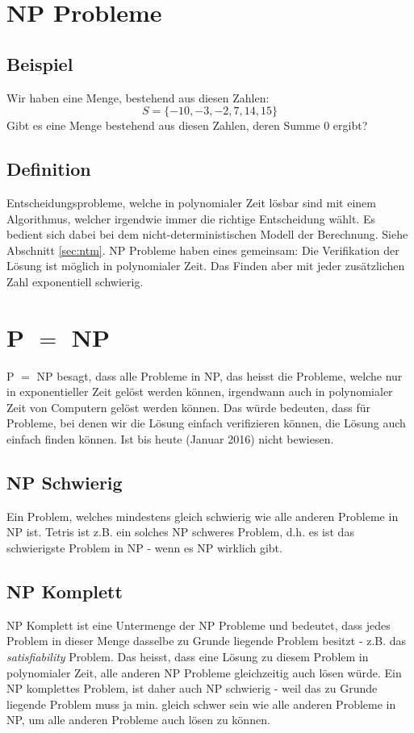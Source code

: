\section{NP Probleme}
\subsection{Beispiel}
Wir haben eine Menge, bestehend aus diesen Zahlen:
\begin{displaymath}
S = \{ -10, -3, -2,7, 14, 15 \}
\end{displaymath}
Gibt es eine Menge bestehend aus diesen Zahlen, deren Summe 0 ergibt?

\subsection{Definition}
Entscheidungsprobleme, welche in polynomialer Zeit lösbar sind mit einem Algorithmus, welcher irgendwie immer die richtige Entscheidung wählt. Es bedient sich dabei bei dem nicht-deterministischen Modell der Berechnung. Siehe Abschnitt \ref{sec:ntm}. NP Probleme haben eines gemeinsam: Die Verifikation der Lösung ist möglich in polynomialer Zeit. Das Finden aber mit jeder zusätzlichen Zahl exponentiell schwierig. 

\section{P \(=\) NP}
P \(=\) NP besagt, dass alle Probleme in NP, das heisst die Probleme, welche nur in exponentieller Zeit gelöst werden können, irgendwann auch in polynomialer Zeit von Computern gelöst werden können. Das würde bedeuten, dass für Probleme, bei denen wir die Lösung einfach verifizieren können, die Lösung auch einfach finden können. Ist bis heute (Januar 2016) nicht bewiesen.

\subsection{NP Schwierig}
Ein Problem, welches mindestens gleich schwierig wie alle anderen Probleme in NP ist. Tetris ist z.B. ein solches NP schweres Problem, d.h. es ist das schwierigste Problem in NP - wenn es NP wirklich gibt.
\subsection{NP Komplett}
NP Komplett ist eine Untermenge der NP Probleme und bedeutet, dass jedes Problem in dieser Menge dasselbe zu Grunde liegende Problem besitzt - z.B. das \textit{satisfiability} Problem. Das heisst, dass eine Lösung zu diesem Problem in polynomialer Zeit, alle anderen NP Probleme gleichzeitig auch lösen würde. Ein NP komplettes Problem, ist daher auch NP schwierig - weil das zu Grunde liegende Problem muss ja min. gleich schwer sein wie alle anderen Probleme in NP, um alle anderen Probleme auch lösen zu können. 

